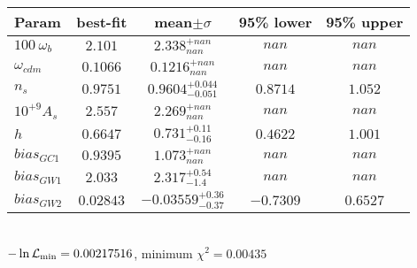 \begin{tabular}{|l|c|c|c|c|} 
 \hline 
Param & best-fit & mean$\pm\sigma$ & 95\% lower & 95\% upper \\ \hline 
$100~\omega_{b }$ &$2.101$ & $2.338_{nan}^{+nan}$ & $nan$ & $nan$ \\ 
$\omega_{cdm }$ &$0.1066$ & $0.1216_{nan}^{+nan}$ & $nan$ & $nan$ \\ 
$n_{s }$ &$0.9751$ & $0.9604_{-0.051}^{+0.044}$ & $0.8714$ & $1.052$ \\ 
$10^{+9}A_{s }$ &$2.557$ & $2.269_{nan}^{+nan}$ & $nan$ & $nan$ \\ 
$h$ &$0.6647$ & $0.731_{-0.16}^{+0.11}$ & $0.4622$ & $1.001$ \\ 
$bias_{GC 1 }$ &$0.9395$ & $1.073_{nan}^{+nan}$ & $nan$ & $nan$ \\ 
$bias_{GW 1 }$ &$2.033$ & $2.317_{-1.4}^{+0.54}$ & $nan$ & $nan$ \\ 
$bias_{GW 2 }$ &$0.02843$ & $-0.03559_{-0.37}^{+0.36}$ & $-0.7309$ & $0.6527$ \\ 
\hline 
 \end{tabular} \\ 
$-\ln{\cal L}_\mathrm{min} =0.00217516$, minimum $\chi^2=0.00435$ \\ 
